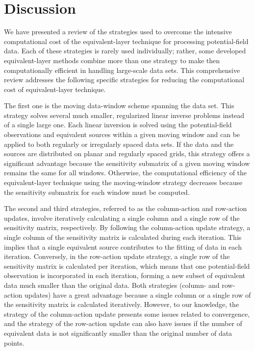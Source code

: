 \section{Discussion}

We have presented a review of the strategies used to overcome the intensive computational cost of the equivalent-layer technique for processing potential-field data. 
Each of these strategies is rarely used  individually; rather, some 
developed equivalent-layer methods combine more than one strategy to make then
computationally efficient in handling large-scale data sets.
This comprehensive review addresses the following specific strategies for reducing the computational cost of equivalent-layer technique.

The first one is the moving data-window scheme spanning the data set.
This strategy solves several much smaller, regularized linear inverse problems 
instead of a single large one.
Each linear inversion is solved using the potential-field observations and equivalent sources within a given moving window and can be applied to both regularly or irregularly spaced data sets.
If the data and the sources are distributed on planar and regularly spaced grids, this strategy offers a significant advantage because the sensitivity submatrix of a given moving window remains the same for all windows.
Otherwise, the computational efficiency of the equivalent-layer technique using the moving-window strategy decreases because the sensitivity submatrix for each window must be computed.

The second and third strategies, referred to as the column-action and row-action updates, involve iteratively calculating a single column and a single row of the sensitivity matrix, respectively.
By following the column-action update strategy, a single column of the sensitivity matrix is calculated during each iteration. 
This implies that a single equivalent source contributes to the fitting of data in each iteration.
Conversely, in the row-action update strategy, a single row of the sensitivity matrix is calculated per iteration, which means that  one potential-field observation is incorporated in each iteration, 
forming a new subset of equivalent data much smaller than the original data.
Both strategies (column- and row-action updates) have a great advantage  because a single column or a single row of the sensitivity matrix is calculated iteratively.
However, to our knowledge, the strategy of the column-action update presents some issues related to convergence, and the strategy of the row-action update can also have issues if the number of equivalent data  is not significantly smaller than the original number of data points.


